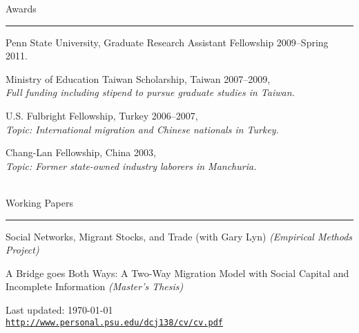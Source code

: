 \documentclass[letterpaper]{article}
\def\footerlink{http://www.personal.psu.edu/dcj138/cv/cv.pdf}
\renewenvironment{itemize}{
  \begin{list}{}{
    \setlength{\leftmargin}{1.5em}
  }
}{
  \end{list}
}
\begin{document}
\vspace{4mm}
{\Large Awards}
\vspace{1mm}
 \hrule

\begin{itemize}
\item Penn State University, Graduate Research Assistant Fellowship 2009--Spring 2011.
\item Ministry of Education Taiwan Scholarship, Taiwan 2007--2009,\\
	\hspace*{1cm}\emph{Full funding including stipend to pursue graduate studies in Taiwan.}
\item U.S. Fulbright Fellowship, Turkey 2006--2007,\\
	\hspace*{1cm}\emph{Topic: International migration and Chinese nationals in Turkey}.
\item Chang-Lan Fellowship, China 2003,\\
	\hspace*{1cm}\emph{Topic: Former state-owned industry laborers in Manchuria.} \\ \\
\end{itemize}

\vspace{4mm}
{\Large Working Papers}
\vspace{1mm}
 \hrule
\begin{itemize}
 \item Social Networks, Migrant Stocks, and Trade (with Gary Lyn) \emph{(Empirical Methods Project)}
 \item A Bridge goes Both Ways: A Two-Way Migration Model with Social Capital and Incomplete Information \emph{(Master's Thesis)}
\end{itemize}

\bigskip

\begin{center}
  \begin{footnotesize}
    Last updated: \today \\
    \href{\footerlink}{\texttt{\footerlink}}
  \end{footnotesize}
\end{center}
\end{document}
